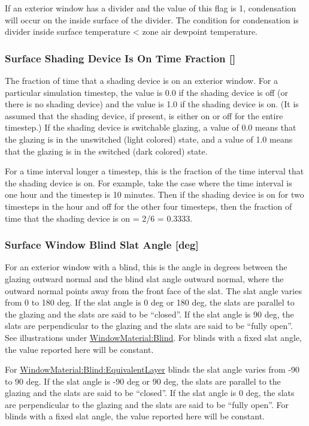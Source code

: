 If an exterior window has a divider and the value of this flag is 1, condensation will occur on the inside surface of the divider. The condition for condensation is divider inside surface temperature \textless{} zone air dewpoint temperature.

\subsubsection{Surface Shading Device Is On Time Fraction {[]}}\label{surface-shading-device-is-on-time-fraction}

The fraction of time that a shading device is on an exterior window. For a particular simulation timestep, the value is 0.0 if the shading device is off (or there is no shading device) and the value is 1.0 if the shading device is on. (It is assumed that the shading device, if present, is either on or off for the entire timestep.) If the shading device is switchable glazing, a value of 0.0 means that the glazing is in the unswitched (light colored) state, and a value of 1.0 means that the glazing is in the switched (dark colored) state.

For a time interval longer a timestep, this is the fraction of the time interval that the shading device is on. For example, take the case where the time interval is one hour and the timestep is 10 minutes. Then if the shading device is on for two timesteps in the hour and off for the other four timesteps, then the fraction of time that the shading device is on = 2/6 = 0.3333.

\subsubsection{Surface Window Blind Slat Angle {[}deg{]}}\label{surface-window-blind-slat-angle-deg}

For an exterior window with a blind, this is the angle in degrees between the glazing outward normal and the blind slat angle outward normal, where the outward normal points away from the front face of the slat. The slat angle varies from 0 to 180 deg. If the slat angle is 0 deg or 180 deg, the slats are parallel to the glazing and the slats are said to be ``closed''. If the slat angle is 90 deg, the slats are perpendicular to the glazing and the slats are said to be ``fully open''. See illustrations under \hyperref[windowmaterialblind]{WindowMaterial:Blind}. For blinds with a fixed slat angle, the value reported here will be constant.

For \hyperref[windowmaterialblindequivalentlayer]{WindowMaterial:Blind:EquivalentLayer} blinds the slat angle varies from -90 to 90 deg. If the slat angle is -90 deg or 90 deg, the slats are parallel to the glazing and the slats are said to be ``closed''. If the slat angle is 0 deg, the slats are perpendicular to the glazing and the slats are said to be ``fully open''. For blinds with a fixed slat angle, the value reported here will be constant.


